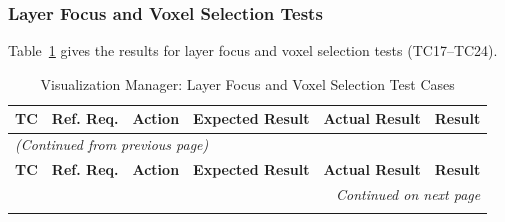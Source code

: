 \documentclass[12pt, titlepage]{article}
\begin{document}
\begin{longtable}{c
    >{\raggedright\arraybackslash}p{1.5cm}
    >{\raggedright\arraybackslash}p{3cm}
    >{\raggedright\arraybackslash}p{3cm}
  >{\raggedright\arraybackslash}p{5cm} c}
\end{longtable}

\subsubsection{Layer Focus and Voxel Selection Tests}
Table~\ref{table:vm_layer_tests} gives the results for layer focus and voxel selection tests (TC17--TC24).

\begin{longtable}{c
    >{\raggedright\arraybackslash}p{1.5cm}
    >{\raggedright\arraybackslash}p{3cm}
    >{\raggedright\arraybackslash}p{3cm}
  >{\raggedright\arraybackslash}p{5cm} c}
  \caption{Visualization Manager: Layer Focus and Voxel Selection Test Cases}
  \label{table:vm_layer_tests} \\
  \toprule
  \textbf{TC} & \textbf{Ref. Req.} & \textbf{Action} &
  \textbf{Expected Result} & \textbf{Actual Result} & \textbf{Result} \\
  \midrule
  \endfirsthead

  \multicolumn{6}{l}{\textit{(Continued from previous page)}} \\
  \toprule
  \textbf{TC} & \textbf{Ref. Req.} & \textbf{Action} &
  \textbf{Expected Result} & \textbf{Actual Result} & \textbf{Result} \\
  \midrule
  \endhead

  \multicolumn{6}{r}{\textit{Continued on next page}} \\
  \endfoot

  \bottomrule
  \endlastfoot


\end{longtable}
\end{document}
